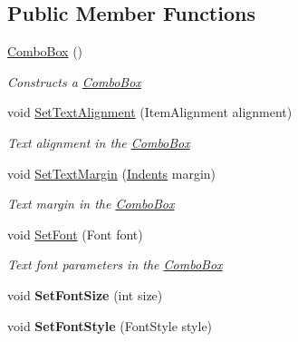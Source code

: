 \subsection*{Public Member Functions}
\begin{DoxyCompactItemize}
\item 
\mbox{\hyperlink{class_space_v_i_l_1_1_combo_box_a5d981f81824ff870fa91043c93394f68}{Combo\+Box}} ()
\begin{DoxyCompactList}\small\item\em Constructs a \mbox{\hyperlink{class_space_v_i_l_1_1_combo_box}{Combo\+Box}} \end{DoxyCompactList}\item 
void \mbox{\hyperlink{class_space_v_i_l_1_1_combo_box_a43bcc26da1d80a462c541aea0a830b56}{Set\+Text\+Alignment}} (Item\+Alignment alignment)
\begin{DoxyCompactList}\small\item\em Text alignment in the \mbox{\hyperlink{class_space_v_i_l_1_1_combo_box}{Combo\+Box}} \end{DoxyCompactList}\item 
void \mbox{\hyperlink{class_space_v_i_l_1_1_combo_box_ad770a207c2e8525603e55f584605299b}{Set\+Text\+Margin}} (\mbox{\hyperlink{struct_space_v_i_l_1_1_decorations_1_1_indents}{Indents}} margin)
\begin{DoxyCompactList}\small\item\em Text margin in the \mbox{\hyperlink{class_space_v_i_l_1_1_combo_box}{Combo\+Box}} \end{DoxyCompactList}\item 
void \mbox{\hyperlink{class_space_v_i_l_1_1_combo_box_a6054da3f7eb5440ba249ab2d15128dc9}{Set\+Font}} (Font font)
\begin{DoxyCompactList}\small\item\em Text font parameters in the \mbox{\hyperlink{class_space_v_i_l_1_1_combo_box}{Combo\+Box}} \end{DoxyCompactList}\item 
\mbox{\label{class_space_v_i_l_1_1_combo_box_a68db1339cb3a886fa4150ea5aa26489b}} 
void {\bfseries Set\+Font\+Size} (int size)
\item 
\mbox{\label{class_space_v_i_l_1_1_combo_box_a58c2fb8ac52e8e3e039cfdbc64d1e150}} 
void {\bfseries Set\+Font\+Style} (Font\+Style style)
\item 

\end{DoxyCompactItemize}
